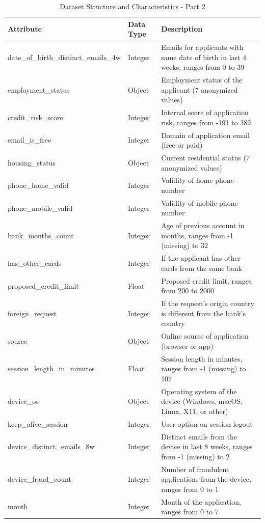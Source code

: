 \documentclass[12pt,a4paper]{report}
\begin{document}
\begin{table}[htbp]
    \centering
    \caption{Dataset Structure and Characteristics - Part 2}
    \begin{tabular}{|p{6cm}|p{3cm}|p{7cm}|}
        \hline
        \textbf{Attribute} & \textbf{Data Type} & \textbf{Description} \\ \hline
        date\_of\_birth\_distinct\_emails\_4w & Integer & Emails for applicants with same date of birth in last 4 weeks, ranges from 0 to 39 \\ \hline
        employment\_status & Object & Employment status of the applicant (7 anonymized values) \\ \hline
        credit\_risk\_score & Integer & Internal score of application risk, ranges from -191 to 389 \\ \hline
        email\_is\_free & Integer & Domain of application email (free or paid) \\ \hline
        housing\_status & Object & Current residential status (7 anonymized values) \\ \hline
        phone\_home\_valid & Integer & Validity of home phone number \\ \hline
        phone\_mobile\_valid & Integer & Validity of mobile phone number \\ \hline
        bank\_months\_count & Integer & Age of previous account in months, ranges from -1 (missing) to 32 \\ \hline
        has\_other\_cards & Integer & If the applicant has other cards from the same bank \\ \hline
        proposed\_credit\_limit & Float & Proposed credit limit, ranges from 200 to 2000 \\ \hline
        foreign\_request & Integer & If the request's origin country is different from the bank's country \\ \hline
        source & Object & Online source of application (browser or app) \\ \hline
        session\_length\_in\_minutes & Float & Session length in minutes, ranges from -1 (missing) to 107 \\ \hline
        device\_os & Object & Operating system of the device (Windows, macOS, Linux, X11, or other) \\ \hline
        keep\_alive\_session & Integer & User option on session logout \\ \hline
        device\_distinct\_emails\_8w & Integer & Distinct emails from the device in last 8 weeks, ranges from -1 (missing) to 2 \\ \hline
        device\_fraud\_count & Integer & Number of fraudulent applications from the device, ranges from 0 to 1 \\ \hline
        month & Integer & Month of the application, ranges from 0 to 7 \\ \hline
        \end{tabular}
    \label{tab:data-understanding-part2}
\end{table}
\end{document}
